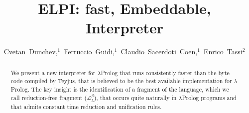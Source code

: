 \documentclass{llncs}
\begin{document}
\title{ELPI: fast, Embeddable, \lp{} Interpreter}





\author{Cvetan~Dunchev,$^1$~Ferruccio~Guidi,$^1$~Claudio~Sacerdoti~Coen,$^1$~Enrico~Tassi$^2$}






\newcommand{\frag}{Reduction-Free Fragment}
\newcommand{\lp}{$\lambda$Prolog}
\newcommand{\Ll}{\ensuremath{\mathcal{L}_\lambda}}
\newcommand{\rff}{\ensuremath{\mathcal{L}_\lambda^\beta}}
\newcommand{\elpi}{ELPI}
\newcommand{\tedius}{Teyjus}
\newcommand{\CSC}[1]{\textcolor{red}{#1}}
\newcommand{\FG}[1]{\textcolor{magenta}{#1}}

\maketitle

\begin{abstract}
We present a new interpreter for \lp{} that runs consistently faster than
the byte code compiled by \tedius{}, that is believed to be the best
available implementation for \lp. 
The key insight is the identification of a fragment of
the language, which we call reduction-free fragment (\rff{}),
that occurs quite naturally in \lp{}
programs and that admits constant time reduction and unification rules.
\end{abstract}
\end{document}
